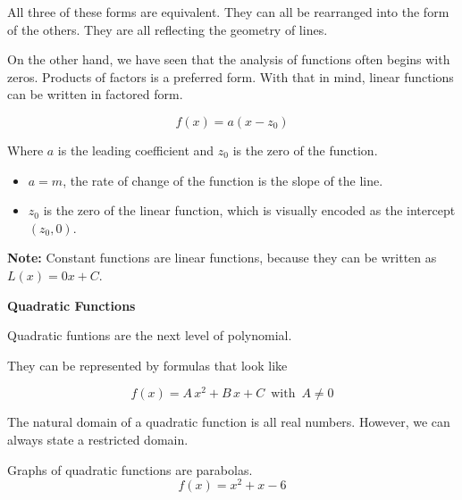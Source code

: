 \documentclass{ximera}
\begin{document}
All three of these forms are equivalent.  They can all be rearranged into the form of the others.  They are all reflecting the geometry of lines.  


On the other hand, we have seen that the analysis of functions often begins with zeros.  Products of factors is a preferred form.  With that in mind, linear functions can be written in factored form.


\[  f(x) = a (x - z_0)  \]

Where $a$ is the leading coefficient and $z_0$ is the zero of the function.





\begin{itemize}

\item $a = m$, the rate of change of the function is the slope of the line.

\item $z_0$ is the zero of the linear function, which is visually encoded as the intercept $(z_0, 0)$.

\end{itemize}



\textbf{Note:} Constant functions are linear functions, because they can be written as $L(x) = 0 x + C$. 












\begin{template}  \textbf{\textcolor{blue!55!black}{Quadratic Functions}} 



Quadratic funtions are the next level of polynomial. 


They can be represented by formulas that look like


\[ f(x) = A \, x^2 + B \, x + C  \,  \text{ with }  \, A \ne 0  \]



\end{template}



The natural domain of a quadratic function is all real numbers.  However, we can always state a restricted domain.







Graphs of quadratic functions are parabolas. 
\[ f(x) = x^2 + x - 6\]
\end{document}
